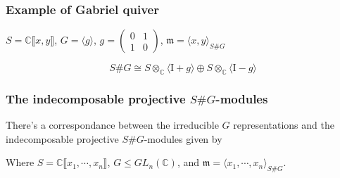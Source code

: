 \documentclass[screen, aspectratio=43]{beamer}
\theoremstyle{definition}
\newcommand{\C}{\mathbb{C}}
\begin{document}
\begin{frame}[fragile]
	\frametitle{Example of Gabriel quiver}
	\begin{example}
		\begin{center}
		$S = \C\llbracket x, y \rrbracket$, $G= \langle g \rangle$, $g = \begin{pmatrix}
		0 & 1\\
		1 & 0
		\end{pmatrix}$, $\mathfrak{m} = \langle x, y \rangle_{S\#G}$
		\end{center}
		$$ S\#G \cong S \otimes_\C \langle \mathrm{I} + g \rangle \oplus S \otimes_\C \langle \mathrm{I} - g \rangle $$
		\begin{center}
		\end{center}
	\end{example}
\end{frame}

\begin{frame}[fragile]
	\frametitle{The indecomposable projective $S\#G$-modules}
	\begin{theorem}
		There's a correspondance between the irreducible $G$ representations and the indecomposable projective $S\#G$-modules given by
		\begin{center}
		\end{center}
		Where $S = \C\llbracket x_1, \cdots, x_n \rrbracket$, $G \leq GL_n(\C)$, and $\mathfrak{m} = \langle x_1, \cdots, x_n \rangle_{S\#G}$.
	\end{theorem}
\end{frame}
\end{document}
